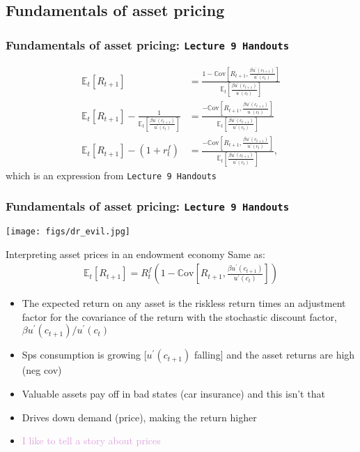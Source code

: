 \documentclass[presentation,dvipsnames]{beamer}
\begin{document}
\subsection{Fundamentals of asset pricing}

\begin{frame}
\frametitle{Fundamentals of asset pricing: \texttt{Lecture 9 Handouts}}
\begin{align*}
\mathbb{E}_{t} \left[ R_{t+1} \right] &=
\frac{1 - \mathbb{C} \text{ov} \left[ R_{t+1}, \frac{\beta u^{\prime}(c_{t+1})}{u^{\prime}(c_{t})} \right]}{
  \mathbb{E}_{t} \left[ \frac{\beta u^{\prime}(c_{t+1})}{u^{\prime}(c_{t})} \right]} \\
\mathbb{E}_{t} \left[ R_{t+1} \right] - \frac{1}{\mathbb{E}_{t} \left[ \frac{\beta u^{\prime}(c_{t+1})}{u^{\prime}(c_{t})} \right]} &=
\frac{- \mathbb{C} \text{ov} \left[ R_{t+1}, \frac{\beta u^{\prime}(c_{t+1})}{u^{\prime}(c_{t})} \right]}{
  \mathbb{E}_{t} \left[ \frac{\beta u^{\prime}(c_{t+1})}{u^{\prime}(c_{t})} \right]} \\
\mathbb{E}_{t} \left[ R_{t+1} \right] - (1+r_{t}^{f}) &= \frac{- \mathbb{C} \text{ov} \left[ R_{t+1}, \frac{\beta u^{\prime}(c_{t+1})}{u^{\prime}(c_{t})} \right]}{
  \mathbb{E}_{t} \left[ \frac{\beta u^{\prime}(c_{t+1})}{u^{\prime}(c_{t})} \right]},
\end{align*}
which is an expression from \texttt{Lecture 9 Handouts}
\end{frame}

\begin{frame}
\frametitle{Fundamentals of asset pricing: \texttt{Lecture 9 Handouts}}
\centerline{\texttt{[image: figs/dr\_evil.jpg]}}
\end{frame}

\begin{frame}[label=sec-4-5]{Interpreting asset prices in an endowment economy}
Same as:
\begin{align*}
\mathbb{E}_{t} \left[ R_{t+1} \right] = R^{f}_{t} \left( 1 - \mathbb{C} \text{ov} \left[ R_{t+1}, \frac{\beta u^{\prime}(c_{t+1})}{u^{\prime}(c_{t})} \right] \right)
\end{align*}

\begin{itemize}[label={--}]
\item The expected return on any asset is the riskless return times an adjustment factor for the covariance of the return with the stochastic discount factor, $\beta u^{\prime}(c_{t+1})/u^{\prime}(c_{t})$
\item Sps consumption is growing [$u^{\prime}(c_{t+1})$ falling] and the asset returns are high (neg cov)
\item Valuable assets pay off in bad states (car insurance) and this isn't that
\item Drives down demand (price), making the return higher
\item \textcolor{Plum}{I like to tell a story about prices}
\end{itemize}
\end{frame}
\end{document}
